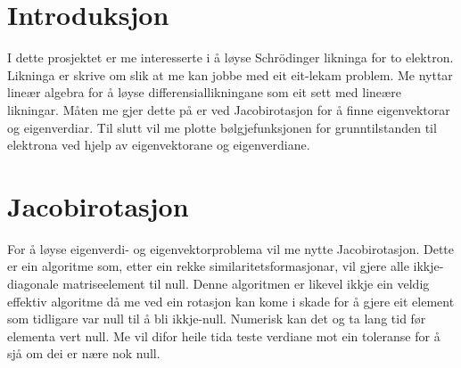 \documentclass[11pt, a4paper]{article}
\begin{document}
\newpage
  \tableofcontents
\newpage

\section{Introduksjon}
  I dette prosjektet er me interesserte i å løyse Schrödinger likninga for to elektron. Likninga er skrive om slik at me kan jobbe med eit eit-lekam problem.
  Me nyttar lineær algebra for å løyse differensiallikningane som eit sett med lineære likningar. Måten me gjer dette på er ved Jacobirotasjon 
  for å finne eigenvektorar og eigenverdiar. Til slutt vil me plotte bølgjefunksjonen for grunntilstanden til elektrona ved hjelp av eigenvektorane og 
  eigenverdiane.


\section{Jacobirotasjon}
  For å løyse eigenverdi- og eigenvektorproblema vil me nytte Jacobirotasjon. Dette er ein algoritme som, etter ein rekke similaritetsformasjonar, vil 
  gjere alle ikkje-diagonale matriseelement til null. Denne algoritmen er likevel ikkje ein veldig effektiv algoritme då me ved ein rotasjon kan kome 
  i skade for å gjere eit element som tidligare var null til å bli ikkje-null. Numerisk kan det og ta lang tid før elementa vert null. Me vil difor heile 
  tida teste verdiane mot ein toleranse for å sjå om dei er nære nok null.
\end{document}
